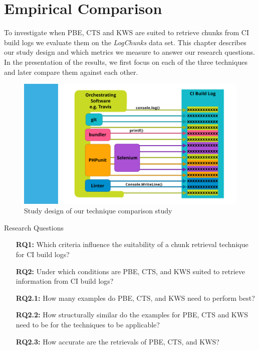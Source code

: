 \documentclass[\myrootdir/main.tex]{subfiles}
\begin{document}
\chapter{Empirical Comparison}
\label{sec:study}
To investigate when PBE, CTS and KWS are suited to retrieve chunks from CI build logs we evaluate them on the \emph{LogChunks} data set.
This chapter describes our study design and which metrics we measure to answer our research questions.
In the presentation of the results, we first focus on each of the three techniques and later compare them against each other.


\begin{figure}[htbp]
	\centering
	\includegraphics[page=2, width=\textwidth, trim={0cm 1cm 1.5cm 0.5cm}, clip]{img/overview-graphics.pdf}
	\caption{Study design of our technique comparison study}
	\label{fig:study}
\end{figure}


\begin{simplebox}{Research Questions}
\begin{itemize}
  \item[\textbf{RQ1:}] Which criteria influence the suitability of a chunk retrieval technique for CI build logs?
  \item[\textbf{RQ2:}] Under which conditions are PBE, CTS, and KWS suited to retrieve information from CI build logs?
  \item[\textbf{RQ2.1:}] How many examples do PBE, CTS, and KWS need to perform best?
  \item[\textbf{RQ2.2:}] How structurally similar do the examples for PBE, CTS and KWS need to be for the techniques to be applicable?
  \item[\textbf{RQ2.3:}] How accurate are the retrievals of PBE, CTS, and KWS?
\end{itemize}
\end{simplebox}
\end{document}
